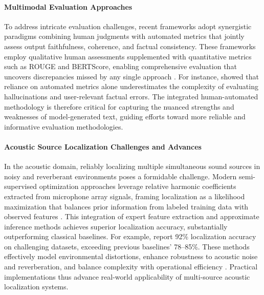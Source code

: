 \documentclass[sigconf]{acmart}
\begin{document}
\paragraph{Multimodal Evaluation Approaches}  
To address intricate evaluation challenges, recent frameworks adopt synergistic paradigms combining human judgments with automated metrics that jointly assess output faithfulness, coherence, and factual consistency. These frameworks employ qualitative human assessments supplemented with quantitative metrics such as ROUGE and BERTScore, enabling comprehensive evaluation that uncovers discrepancies missed by any single approach \cite{ref10,ref51}. For instance, \cite{ref1} showed that reliance on automated metrics alone underestimates the complexity of evaluating hallucinations and user-relevant factual errors. The integrated human-automated methodology is therefore critical for capturing the nuanced strengths and weaknesses of model-generated text, guiding efforts toward more reliable and informative evaluation methodologies.

\paragraph{Acoustic Source Localization Challenges and Advances}  
In the acoustic domain, reliably localizing multiple simultaneous sound sources in noisy and reverberant environments poses a formidable challenge. Modern semi-supervised optimization approaches leverage relative harmonic coefficients extracted from microphone array signals, framing localization as a likelihood maximization that balances prior information from labeled training data with observed features \cite{ref52}. This integration of expert feature extraction and approximate inference methods achieves superior localization accuracy, substantially outperforming classical baselines. For example, \cite{ref52} report 92\% localization accuracy on challenging datasets, exceeding previous baselines' 78--85\%. These methods effectively model environmental distortions, enhance robustness to acoustic noise and reverberation, and balance complexity with operational efficiency \cite{ref1,ref2,ref3,ref26}. Practical implementations thus advance real-world applicability of multi-source acoustic localization systems.
\end{document}
